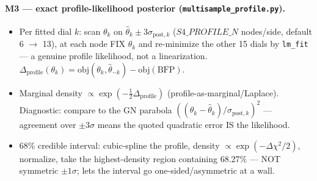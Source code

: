 \documentclass[aps,prd,reprint,superscriptaddress,nofootinbib,amsmath,amssymb,floatfix]{revtex4-1}
\begin{document}
\paragraph{M3 --- exact profile-likelihood posterior (\texttt{multisample\_profile.py}).}
\begin{itemize}
  \item Per fitted dial $k$: scan $\theta_k$ on $\hat\theta_k\pm3\sigma_{\mathrm{post},k}$ ($S4\_PROFILE\_N$
        nodes/side, default 6 $\rightarrow$ 13), at each node FIX $\theta_k$ and re-minimize the other 15
        dials by \texttt{lm\_fit} --- a genuine profile likelihood, not a linearization.
        $\Delta_\mathrm{profile}(\theta_k)=\mathrm{obj}(\theta_k,\hat\theta_{-k})-\mathrm{obj}(\mathrm{BFP})$.
  \item Marginal density $\propto\exp(-\tfrac12\Delta_\mathrm{profile})$ (profile-as-marginal/Laplace).
        Diagnostic: compare to the GN parabola $((\theta_k-\hat\theta_k)/\sigma_{\mathrm{post},k})^2$ ---
        agreement over $\pm3\sigma$ means the quoted quadratic error IS the likelihood.
  \item 68\% credible interval: cubic-spline the profile, density $\propto\exp(-\Delta\chi^2/2)$, normalize,
        take the highest-density region containing 68.27\% --- NOT symmetric $\pm1\sigma$; lets the interval
        go one-sided/asymmetric at a wall.
\end{itemize}
\end{document}
